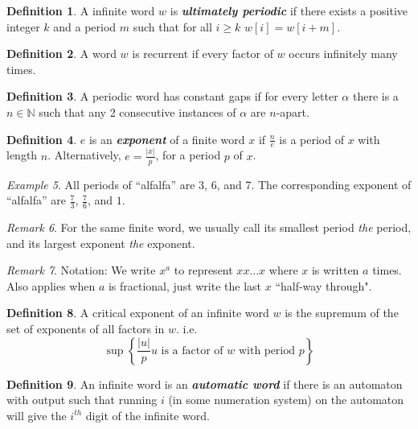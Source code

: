 \documentclass{article}
\theoremstyle{definition}
\newtheorem{definition}{Definition}[section]
\theoremstyle{remark}
\newtheorem{remark}[definition]{Remark}
\theoremstyle{remark}
\newtheorem{example}[definition]{Example}
\theoremstyle{plain}
\newcommand{\N}{\mathbb{N}}
\theoremstyle{definition}
\newcommand{\term}[1]{\emph{\textbf{#1}}}
\begin{document}
\begin{definition}
A infinite word $w$ is \term{ultimately periodic} if there exists a positive integer $k$ and a period $m$ such that for all $i\ge k$ $w[i] = w[i+m]$.
\end{definition}

\begin{definition}
A word $w$ is recurrent if every factor of $w$ occurs infinitely many times. 
\end{definition}

\begin{definition}
A periodic word has constant gaps if for every letter $\alpha$ there is a $n\in\N$ such that any 2 consecutive instances of $\alpha$ are $n$-apart.
\end{definition}

\begin{definition}
$e$ is an \term{exponent} of a finite word $x$ if $\frac{n}{e}$ is a period of $x$ with length $n$. Alternatively, $e = \frac{|x|}{p}$, for a period $p$ of $x$.
\end{definition}

\begin{example}
All periods of ``alfalfa'' are 3, 6, and 7.
The corresponding exponent of ``alfalfa'' are $\frac{7}{3}$, $\frac{7}{6}$, and $1$.
\end{example}

\begin{remark}
For the same finite word, we usually call its smallest period \emph{the} period, and its largest exponent \emph{the} exponent.
\end{remark}

\begin{remark}
Notation: We write $x^a$ to represent $xx\dots x$ where $x$ is written $a$ times. Also applies when $a$ is fractional, just write the last $x$ ``half-way through".
\end{remark}

\begin{definition}
A critical exponent of an infinite word $w$ is the supremum of the set of exponents of all factors in $w$. i.e. 
$$\sup\left\{\frac{|u|}{p} \text{$u$ is a factor of $w$ with period $p$}\right\}$$
\end{definition}

\begin{definition}
An infinite word is an \term{automatic word} if there is an automaton with output such that running $i$ (in some numeration system) on the automaton will give the $i^{th}$ digit of the infinite word. 
\end{definition}
\end{document}
